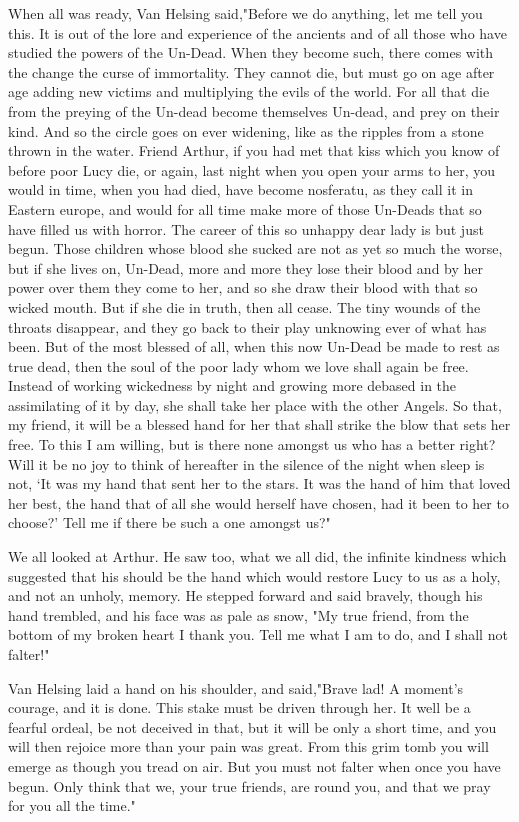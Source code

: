 When all was ready, Van Helsing said,"Before we do anything, let me tell you this. It is out of the lore and experience of the ancients and of all those who have studied the powers of the Un-Dead. When they become such, there comes with the change the curse of immortality. They cannot die, but must go on age after age adding new victims and multiplying the evils of the world. For all that die from the preying of the Un-dead become themselves Un-dead, and prey on their kind. And so the circle goes on ever widening, like as the ripples from a stone thrown in the water. Friend Arthur, if you had met that kiss which you know of before poor Lucy die, or again, last night when you open your arms to her, you would in time, when you had died, have become nosferatu, as they call it in Eastern europe, and would for all time make more of those Un-Deads that so have filled us with horror. The career of this so unhappy dear lady is but just begun. Those children whose blood she sucked are not as yet so much the worse, but if she lives on, Un-Dead, more and more they lose their blood and by her power over them they come to her, and so she draw their blood with that so wicked mouth. But if she die in truth, then all cease. The tiny wounds of the throats disappear, and they go back to their play unknowing ever of what has been. But of the most blessed of all, when this now Un-Dead be made to rest as true dead, then the soul of the poor lady whom we love shall again be free. Instead of working wickedness by night and growing more debased in the assimilating of it by day, she shall take her place with the other Angels. So that, my friend, it will be a blessed hand for her that shall strike the blow that sets her free. To this I am willing, but is there none amongst us who has a better right? Will it be no joy to think of hereafter in the silence of the night when sleep is not, `It was my hand that sent her to the stars. It was the hand of him that loved her best, the hand that of all she would herself have chosen, had it been to her to choose?' Tell me if there be such a one amongst us?" 

We all looked at Arthur. He saw too, what we all did, the infinite kindness which suggested that his should be the hand which would restore Lucy to us as a holy, and not an unholy, memory. He stepped forward and said bravely, though his hand trembled, and his face was as pale as snow, "My true friend, from the bottom of my broken heart I thank you. Tell me what I am to do, and I shall not falter!" 

Van Helsing laid a hand on his shoulder, and said,"Brave lad! A moment's courage, and it is done. This stake must be driven through her. It well be a fearful ordeal, be not deceived in that, but it will be only a short time, and you will then rejoice more than your pain was great. From this grim tomb you will emerge as though you tread on air. But you must not falter when once you have begun. Only think that we, your true friends, are round you, and that we pray for you all the time." 

